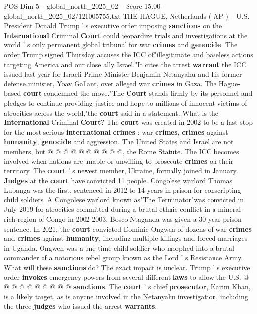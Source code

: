 \begin{textsample}{POS Dim 5 – global\_north\_2025\_02 – Score 15.00 – global\_north\_2025\_02/121005755.txt}  \label{ex:f5_pos_333}
THE HAGUE, Netherlands ( AP ) -- U.S.
President Donald Trump ' s executive order imposing \textbf{sanctions} on the \textbf{International} Criminal \textbf{Court} could jeopardize trials and investigations at the world ' s only permanent global tribunal for war \textbf{crimes} and \textbf{genocide}.
The order Trump signed Thursday accuses the ICC of"illegitimate and baseless actions targeting America and our close ally Israel."It cites the arrest \textbf{warrant} the ICC issued last year for Israeli Prime Minister Benjamin Netanyahu and his former defense minister, Yoav Gallant, over alleged war \textbf{crimes} in Gaza.
The Hague-based \textbf{court} condemned the move."The \textbf{Court} stands firmly by its personnel and pledges to continue providing justice and hope to millions of innocent victims of atrocities across the world,"the \textbf{court} said in a statement.
What is the \textbf{International} Criminal \textbf{Court}?
The \textbf{court} was created in 2002 to be a last stop for the most serious \textbf{international} \textbf{crimes} : war \textbf{crimes}, \textbf{crimes} against \textbf{humanity}, \textbf{genocide} and aggression.
The United States and Israel are not members, but @ @ @ @ @ @ @ @ @ @, the Rome Statute.
The ICC becomes involved when nations are unable or unwilling to prosecute \textbf{crimes} on their territory.
The \textbf{court} ' s newest member, Ukraine, formally joined in January. \textbf{Judges} at the \textbf{court} have convicted 11 people.
Congolese warlord Thomas Lubanga was the first, sentenced in 2012 to 14 years in prison for conscripting child soldiers.
A Congolese warlord known as"The Terminator"was convicted in July 2019 for atrocities committed during a brutal ethnic conflict in a mineral-rich region of Congo in 2002-2003.
Bosco Ntaganda was given a 30-year prison sentence.
In 2021, the \textbf{court} convicted Dominic Ongwen of dozens of war \textbf{crimes} and \textbf{crimes} against \textbf{humanity}, including multiple killings and forced marriages in Uganda.
Ongwen was a one-time child soldier who morphed into a brutal commander of a notorious rebel group known as the Lord ' s Resistance Army.
What will these \textbf{sanctions} do?
The exact impact is unclear.
Trump ' s executive order \textbf{invokes} emergency powers from several different \textbf{laws} to allow the U.S. @ @ @ @ @ @ @ @ @ @ \textbf{sanctions}.
The \textbf{court} ' s chief \textbf{prosecutor}, Karim Khan, is a likely target, as is anyone involved in the Netanyahu investigation, including the three \textbf{judges} who issued the arrest \textbf{warrants}.

\end{textsample}
